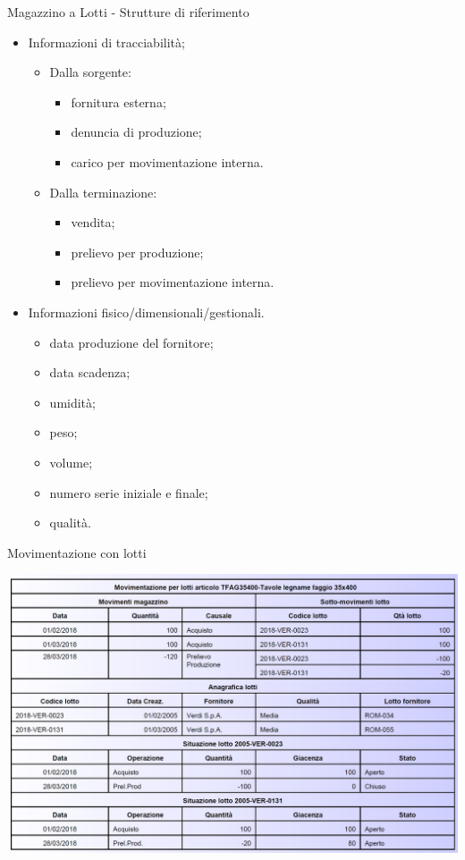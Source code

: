 \documentclass{beamer}
\begin{document}
\begin{frame}{Magazzino a Lotti - Strutture di riferimento}
    \begin{itemize}
    \item Informazioni di tracciabilità;
        \begin{itemize}
            \item Dalla sorgente:
            \begin{itemize}
                \item fornitura esterna;
                \item denuncia di produzione;
                \item carico per movimentazione interna.
            \end{itemize}
            \item Dalla terminazione:
            \begin{itemize}
                \item vendita;
                \item prelievo per produzione;
                \item prelievo per movimentazione interna.
            \end{itemize}
        \end{itemize}
        \item Informazioni fisico/dimensionali/gestionali.
        \begin{itemize}
            \item data produzione del fornitore;
            \item data scadenza;
            \item umidità;
            \item peso;
            \item volume;
            \item numero serie iniziale e finale;
            \item qualità.
        \end{itemize}
    \end{itemize}
\end{frame}

\begin{frame}{Movimentazione con lotti}
    \begin{center}
        \includegraphics[scale=0.4]{movimentazione_lotti.jpg}
    \end{center}
\end{frame}
\end{document}
